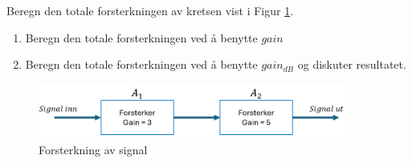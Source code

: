 	
\begin{question}[name=Oppgave, topic=forsterkning]
Beregn den totale forsterkningen av kretsen vist i Figur \ref{fig:forsterk1}.
	\begin{enumerate}[label=\roman*)]
	\item Beregn den totale forsterkningen ved å benytte $gain$
	\item Beregn den totale forsterkningen ved å benytte $gain_{dB}$ og diskuter resultatet.
	\end{enumerate}

	\begin{figure}[H]
	\centering
	\includegraphics[width=0.9\textwidth]{forsterkning/figurer/forsterkning1.png}
	\caption{Forsterkning av signal}
	\label{fig:forsterk1}
\end{figure}
\end{question}

\vspace{0.5cm} %

